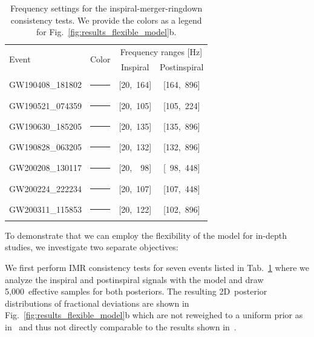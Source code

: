 \begin{table}[ht]
	\caption{
		Frequency settings for the inspiral-merger-ringdown consistency tests. 
        We provide the colors as a legend for Fig.~\ref{fig:results_flexible_model}b.
        }
	\label{table:IMR_consistency_tests}
	\centering
	\setlength{\tabcolsep}{6pt}
	\begin{tabularx}{0.93\columnwidth}{l c c c}
		\toprule
		\multirow{2}{*}{Event} & \multirow{2}{*}{Color} & \multicolumn{2}{c}{Frequency ranges [\si{\hertz}]}
		 \\
		 & & Inspiral & Postinspiral \\
		\midrule
        GW190408\_181802 & \textcolor{GW190408}{\rule[0.5ex]{1em}{1pt}} & [20,~164] & [164,~896]\\
        GW190521\_074359 & \textcolor{GW190521}{\rule[0.5ex]{1em}{1pt}} & [20,~105] & [105,~224]\\
        GW190630\_185205 & \textcolor{GW190630}{\rule[0.5ex]{1em}{1pt}} & [20,~135] & [135,~896]\\
		GW190828\_063205 & \textcolor{GW190828}{\rule[0.5ex]{1em}{1pt}} & [20,~132] & [132,~896]\\
		GW200208\_130117 & \textcolor{GW200208}{\rule[0.5ex]{1em}{1pt}} & [20,~~98] & [~98,~448]\\
		GW200224\_222234 & \textcolor{GW200224}{\rule[0.5ex]{1em}{1pt}} & [20,~107] & [107,~448]\\
        GW200311\_115853 & \textcolor{GW200311}{\rule[0.5ex]{1em}{1pt}} & [20,~122] & [102,~896] \\
		\bottomrule
	\end{tabularx}
\end{table}

To demonstrate that we can employ the flexibility of the \dingoT model for in-depth studies, we investigate two separate objectives:

We first perform IMR consistency tests for seven events listed in Tab.~\ref{table:IMR_consistency_tests} where we analyze the inspiral and postinspiral signals with the \dingoT model and draw 5,000~effective samples for both posteriors.
The resulting 2D~posterior distributions of fractional deviations are shown in Fig.~\ref{fig:results_flexible_model}b which are not reweighed to a uniform prior as in~\citep{lvk_gwtc3_tests_gr:2025} and thus not directly comparable to the results shown in~\citep{lvk_gwtc3_tests_gr:2025}.

